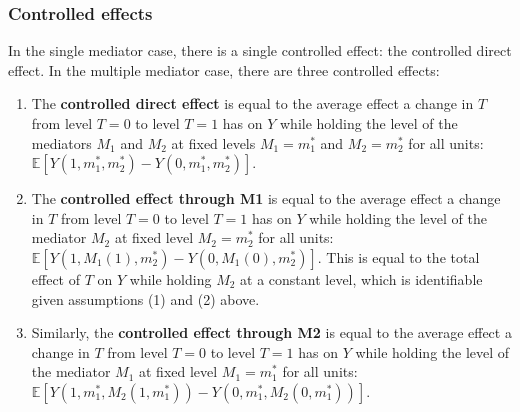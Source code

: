 \documentclass[12pt]{article} %
\numberwithin{equation}{section} %
\begin{document}
\begin{figure}
\centering
{}
\caption[]{}
\label{fig:two_mediator_dag}
\end{figure}


\subsubsection{Controlled effects}

In the single mediator case, there is a single controlled effect: the controlled direct effect. In the multiple mediator case, there are three controlled effects:

\begin{enumerate}
    \item The \textbf{controlled direct effect} is equal to the average effect a change in $T$ from level $T = 0$ to level $T = 1$ has on $Y$ while holding the level of the mediators $M_{1}$ and $M_{2}$ at fixed levels $M_{1} = m_{1}^{*}$ and $M_{2} = m_{2}^{*}$ for all units: $\mathbb{E}[Y(1,m_{1}^{*},m_{2}^{*}) - Y(0,m_{1}^{*},m_{2}^{*})]$. 
    \item The \textbf{controlled effect through M1} is equal to the average effect a change in $T$ from level $T = 0$ to level $T = 1$ has on $Y$ while holding the level of the mediator $M_{2}$ at fixed level $M_{2} = m_{2}^{*}$ for all units: $\mathbb{E}[Y(1,M_{1}(1),m_{2}^{*}) - Y(0,M_{1}(0),m_{2}^{*})]$. This is equal to the total effect of $T$ on $Y$ while holding $M_{2}$ at a constant level, which is identifiable given assumptions (1) and (2) above. 
    \item Similarly, the \textbf{controlled effect through M2} is equal to the average effect a change in $T$ from level $T = 0$ to level $T = 1$ has on $Y$ while holding the level of the mediator $M_{1}$ at fixed level $M_{1} = m_{1}^{*}$ for all units: $\mathbb{E}[Y(1,m_{1}^{*},M_{2}(1,m_{1}^{*})) - Y(0,m_{1}^{*},M_{2}(0,m_{1}^{*}))]$. 
\end{enumerate}
\end{document}
